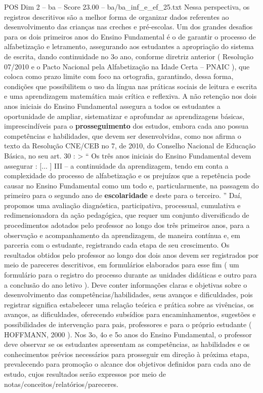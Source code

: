 \begin{textsample}{POS Dim 2 – ba – Score 23.00 – ba/ba\_inf\_e\_ef\_25.txt}
Nessa perspectiva, os registros descritivos são a melhor forma de organizar dados referentes ao desenvolvimento das crianças nas creches e pré-escolas.
Um dos grandes desafios para os dois primeiros anos do Ensino Fundamental é o de garantir o processo de alfabetização e letramento, assegurando aos estudantes a apropriação do sistema de escrita, dando continuidade no 3o ano, conforme diretriz anterior ( Resolução 07/2010 e o Pacto Nacional pela Alfabetização na Idade Certa – PNAIC ), que coloca como prazo limite com foco na ortografia, garantindo, dessa forma, condições que possibilitem o uso da língua nas práticas sociais de leitura e escrita e uma aprendizagem matemática mais crítica e reflexiva.
A não retenção nos dois anos iniciais do Ensino Fundamental assegura a todos os estudantes a oportunidade de ampliar, sistematizar e aprofundar as aprendizagens básicas, imprescindíveis para o \textbf{prosseguimento} dos estudos, embora cada ano possua competências e habilidades, que devem ser desenvolvidas, como nos afirma o texto da Resolução CNE/CEB no 7, de 2010, do Conselho Nacional de Educação Básica, no seu art. 30 : > “ Os três anos iniciais do Ensino Fundamental devem assegurar : [... ] III – a continuidade da aprendizagem, tendo em conta a complexidade do processo de alfabetização e os prejuízos que a repetência pode causar no Ensino Fundamental como um todo e, particularmente, na passagem do primeiro para o segundo ano de \textbf{escolaridade} e deste para o terceiro. ” Daí, propomos uma avaliação diagnóstica, participativa, processual, cumulativa e redimensionadora da ação pedagógica, que requer um conjunto diversificado de procedimentos adotados pelo professor ao longo dos três primeiros anos, para a observação e acompanhamento da aprendizagem, de maneira contínua e, em parceria com o estudante, registrando cada etapa de seu crescimento.
Os resultados obtidos pelo professor ao longo dos dois anos devem ser registrados por meio de pareceres descritivos, em formulários elaborados para esse fim ( um formulário para o registro do processo durante as unidades didáticas e outro para a conclusão do ano letivo ).
Deve conter informações claras e objetivas sobre o desenvolvimento das competências/habilidades, seus avanços e dificuldades, pois registrar significa estabelecer uma relação teórica e prática sobre as vivências, os avanços, as dificuldades, oferecendo subsídios para encaminhamentos, sugestões e possibilidades de intervenção para pais, professores e para o próprio estudante ( HOFFMANN, 2000 ).
Nos 3o, 4o e 5o anos do Ensino Fundamental, o professor deve observar se os estudantes apresentam as competências, as habilidades e os conhecimentos prévios necessários para prosseguir em direção à próxima etapa, prevalecendo para promoção o alcance dos objetivos definidos para cada ano de estudo, cujos resultados serão expressos por meio de notas/conceitos/relatórios/pareceres.

\end{textsample}
